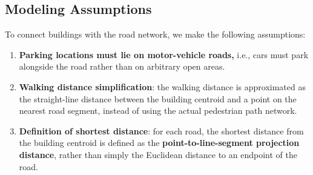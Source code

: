 \documentclass[fleqn,10pt]{olplainarticle}
\begin{document}
\subsection*{Modeling Assumptions}
To connect buildings with the road network, we make the following assumptions:
\begin{enumerate}
    \item \textbf{Parking locations must lie on motor-vehicle roads,} i.e., cars must park alongside the road rather than on arbitrary open areas.
    \item \textbf{Walking distance simplification}: the walking distance is approximated as the straight-line distance between the building centroid and a point on the nearest road segment, instead of using the actual pedestrian path network.
    \item \textbf{Definition of shortest distance}: for each road, the shortest distance from the building centroid is defined as the \textbf{point-to-line-segment projection distance}, rather than simply the Euclidean distance to an endpoint of the road.
\end{enumerate}
\end{document}
